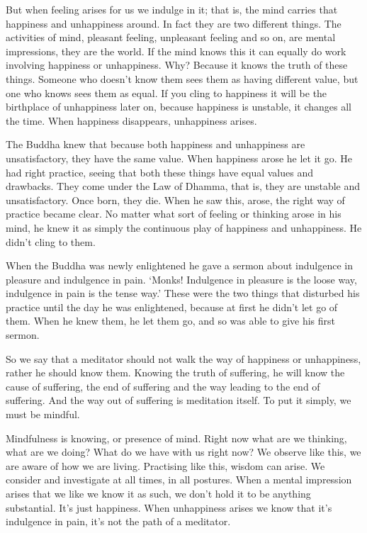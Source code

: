 But when feeling arises for us we indulge in it; that is, the mind carries that happiness and unhappiness around. In fact they are two different things. The activities of mind, pleasant feeling, unpleasant feeling and so on, are mental impressions, they are the world. If the mind knows this it can equally do work involving happiness or unhappiness. Why? Because it knows the truth of these things. Someone who doesn't know them sees them as having different value, but one who knows sees them as equal. If you cling to happiness it will be the birthplace of unhappiness later on, because happiness is unstable, it changes all the time. When happiness disappears, unhappiness arises. 

The Buddha knew that because both happiness and unhappiness are unsatisfactory, they have the same value. When happiness arose he let it go. He had right practice, seeing that both these things have equal values and drawbacks. They come under the Law of Dhamma, that is, they are unstable and unsatisfactory. Once born, they die. When he saw this,  arose, the right way of practice became clear. No matter what sort of feeling or thinking arose in his mind, he knew it as simply the continuous play of happiness and unhappiness. He didn't cling to them. 

When the Buddha was newly enlightened he gave a sermon about indulgence in pleasure and indulgence in pain. `Monks! Indulgence in pleasure is the loose way, indulgence in pain is the tense way.' These were the two things that disturbed his practice until the day he was enlightened, because at first he didn't let go of them. When he knew them, he let them go, and so was able to give his first sermon. 

So we say that a meditator should not walk the way of happiness or unhappiness, rather he should know them. Knowing the truth of suffering, he will know the cause of suffering, the end of suffering and the way leading to the end of suffering. And the way out of suffering is meditation itself. To put it simply, we must be mindful. 

Mindfulness is knowing, or presence of mind. Right now what are we thinking, what are we doing? What do we have with us right now? We observe like this, we are aware of how we are living. Practising like this, wisdom can arise. We consider and investigate at all times, in all postures. When a mental impression arises that we like we know it as such, we don't hold it to be anything substantial. It's just happiness. When unhappiness arises we know that it's indulgence in pain, it's not the path of a meditator. 

